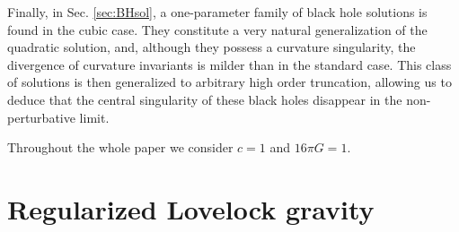 \documentclass[aps,prd,preprint,nofootinbib]{revtex4-1}
\begin{document}
Finally, in Sec. \ref{sec:BHsol}, a one-parameter family of black hole solutions is found in the cubic case. They constitute a very natural generalization of the quadratic solution, and, although they possess a curvature singularity, the divergence of curvature invariants is milder than in the standard case. This class of solutions is then generalized to arbitrary high order truncation, allowing us to deduce that the central singularity of these black holes disappear in the non-perturbative limit.

Throughout the whole paper we consider $c = 1$ and $16 \pi G = 1$.

\section{Regularized Lovelock gravity}\label{sec:lovelock}
\end{document}
